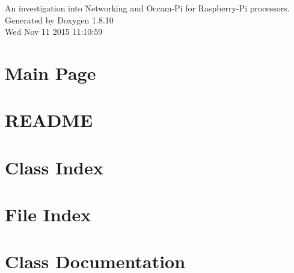 \documentclass[twoside]{book}
\newcommand{\+}{\discretionary{\mbox{\scriptsize$\hookleftarrow$}}{}{}}
\newcommand{\clearemptydoublepage}{%
  \newpage{\pagestyle{empty}\cleardoublepage}%
}
\begin{document}
\hypersetup{pageanchor=false,
             bookmarks=true,
             bookmarksnumbered=true,
             pdfencoding=unicode
            }
\begin{titlepage}
\vspace*{7cm}
\begin{center}%
{\Large An investigation into Networking and Occam-\/\+Pi for Raspberry-\/\+Pi processors. }\\
\vspace*{1cm}
{\large Generated by Doxygen 1.8.10}\\
\vspace*{0.5cm}
{\small Wed Nov 11 2015 11:10:59}\\
\end{center}
\end{titlepage}
\clearemptydoublepage
\tableofcontents
\clearemptydoublepage
{}
\hypersetup{pageanchor=true}

\chapter{Main Page}
\label{index}\hypertarget{index}{}
\chapter{R\+E\+A\+D\+M\+E}
\label{md__r_e_a_d_m_e}
\hypertarget{md__r_e_a_d_m_e}{}

\chapter{Class Index}

\chapter{File Index}

\chapter{Class Documentation}























\end{document}
